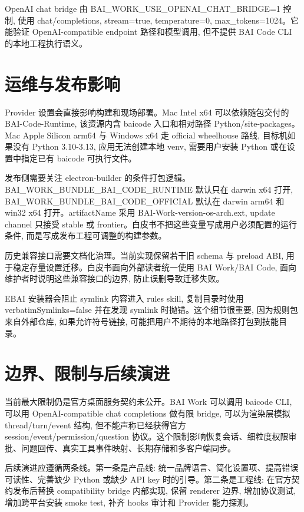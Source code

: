 OpenAI chat bridge 由 BAI\_WORK\_USE\_OPENAI\_CHAT\_BRIDGE=1 控制, 使用 chat/completions, stream=true, temperature=0, max\_tokens=1024。它能验证 OpenAI-compatible endpoint 路径和模型调用, 但不提供 BAI Code CLI 的本地工程执行语义。

\section{运维与发布影响}
Provider 设置会直接影响构建和现场部署。Mac Intel x64 可以依赖随包交付的 BAI-Code-Runtime, 该资源内含 baicode 入口和相对路径 Python/site-packages。Mac Apple Silicon arm64 与 Windows x64 走 official wheelhouse 路线, 目标机如果没有 Python 3.10-3.13, 应用无法创建本地 venv, 需要用户安装 Python 或在设置中指定已有 baicode 可执行文件。

发布侧需要关注 electron-builder 的条件打包逻辑。BAI\_WORK\_BUNDLE\_BAI\_CODE\_RUNTIME 默认只在 darwin x64 打开, BAI\_WORK\_BUNDLE\_BAI\_CODE\_OFFICIAL 默认在 darwin arm64 和 win32 x64 打开。artifactName 采用 BAI-Work-{version}-{os}-{arch}.{ext}, update channel 只接受 stable 或 frontier。白皮书不把这些变量写成用户必须配置的运行条件, 而是写成发布工程可调整的构建参数。

历史兼容接口需要文档化治理。当前实现保留若干旧 schema 与 preload ABI, 用于稳定存量设置迁移。白皮书面向外部读者统一使用 BAI Work/BAI Code, 面向维护者时说明这些兼容接口的边界, 防止误删导致迁移失败。

EBAI 安装器会阻止 symlink 内容进入 rules skill, 复制目录时使用 verbatimSymlinks=false 并在发现 symlink 时抛错。这个细节很重要, 因为规则包来自外部仓库, 如果允许符号链接, 可能把用户不期待的本地路径打包到技能目录。

\section{边界、限制与后续演进}
当前最大限制仍是官方桌面服务契约未公开。BAI Work 可以调用 baicode CLI, 可以用 OpenAI-compatible chat completions 做有限 bridge, 可以为渲染层模拟 thread/turn/event 结构, 但不能声称已经获得官方 session/event/permission/question 协议。这个限制影响恢复会话、细粒度权限审批、问题回传、真实工具事件映射、长期存储和多客户端同步。

后续演进应遵循两条线。第一条是产品线: 统一品牌语言、简化设置项、提高错误可读性、完善缺少 Python 或缺少 API key 时的引导。第二条是工程线: 在官方契约发布后替换 compatibility bridge 内部实现, 保留 renderer 边界, 增加协议测试, 增加跨平台安装 smoke test, 补齐 hooks 审计和 Provider 能力探测。

